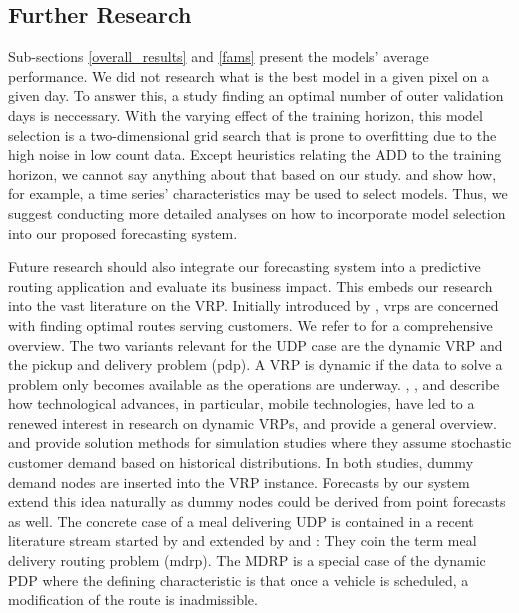 \subsection{Further Research}
\label{further_research}

Sub-sections \ref{overall_results} and \ref{fams} present the models' average
    performance.
We did not research what is the best model in a given pixel on a given day.
To answer this, a study finding an optimal number of outer validation days is
    neccessary.
With the varying effect of the training horizon, this model selection is a
    two-dimensional grid search that is prone to overfitting due to the high
    noise in low count data.
Except heuristics relating the ADD to the training horizon, we cannot say
    anything about that based on our study.
\cite{lemke2010} and \cite{wang2009} show how, for example, a time series'
    characteristics may be used to select models.
Thus, we suggest conducting more detailed analyses on how to incorporate model
    selection into our proposed forecasting system.

Future research should also integrate our forecasting system into a predictive
    routing application and evaluate its business impact.
This embeds our research into the vast literature on the VRP.
Initially introduced by \cite{dantzig1959}, \gls{vrp}s are concerned with
    finding optimal routes serving customers.
We refer to \cite{toth2014} for a comprehensive overview.
The two variants relevant for the UDP case are the dynamic VRP and
    the pickup and delivery problem (\gls{pdp}).
A VRP is dynamic if the data to solve a problem only becomes available
    as the operations are underway.
\cite{thomas2010}, \cite{pillac2013}, and \cite{psaraftis2016} describe how
    technological advances, in particular, mobile technologies, have led to a
    renewed interest in research on dynamic VRPs, and
    \cite{berbeglia2010} provide a general overview.
\cite{ichoua2006} and \cite{ferrucci2013} provide solution methods for
    simulation studies where they assume stochastic customer demand based on
    historical distributions.
In both studies, dummy demand nodes are inserted into the VRP instance.
Forecasts by our system extend this idea naturally as dummy nodes could be
    derived from point forecasts as well.
The concrete case of a meal delivering UDP is contained in a recent
    literature stream started by \cite{ulmer2017} and extended by
    \cite{reyes2018} and \cite{yildiz2018}: They coin the term meal delivery
    routing problem (\gls{mdrp}).
The MDRP is a special case of the dynamic PDP where the defining
    characteristic is that once a vehicle is scheduled, a modification of the
    route is inadmissible.

